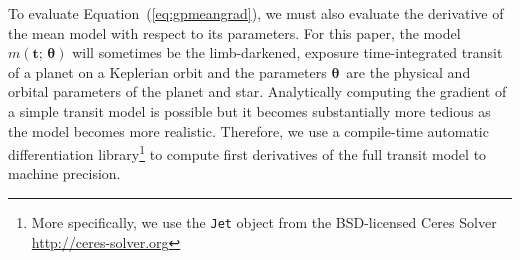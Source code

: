 \documentclass[manuscript, letterpaper]{aastex6}
\newcommand{\paper}{paper}
\renewcommand{\eqref}[1]{\ref{eq:#1}}
\newcommand{\Eq}[1]{Equation~(\eqref{#1})}
\newcommand{\eq}[1]{\Eq{#1}}
\newcommand{\bvec}[1]{{\ensuremath{\boldsymbol{#1}}}}
\newcommand{\meanpars}{{\ensuremath{\bvec{\theta}}}}
\begin{document}
To evaluate \eq{gpmeangrad}, we must also evaluate the derivative of the mean
model with respect to its parameters.
For this \paper, the model $m(\bvec{t};\,\meanpars)$ will sometimes be the
limb-darkened, exposure time-integrated transit of a planet on a Keplerian
orbit and the parameters \meanpars\ are the physical and orbital parameters of
the planet and star.
Analytically computing the gradient of a simple transit model is possible
\citep{Pal:2008} but it becomes substantially more tedious as the model
becomes more realistic.
Therefore, we use a compile-time automatic differentiation library\footnote{%
More specifically, we use the \texttt{Jet} object from the BSD-licensed Ceres
Solver \url{http://ceres-solver.org}} \citep{Agarwal:2016} to compute first
derivatives of the full transit model to machine precision.


\clearpage

\end{document}
